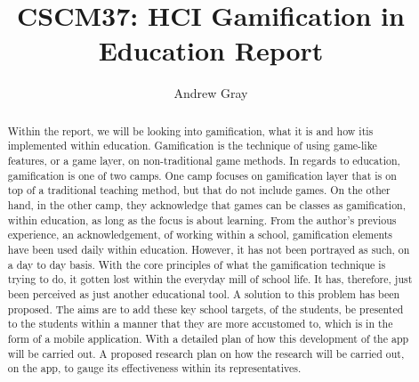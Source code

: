 \documentclass[sigchi]{acmart}
\begin{document}
\title{CSCM37: HCI Gamification in Education Report}

\author{Andrew Gray}


\renewcommand{\shortauthors}{Trovato and Tobin, et al.}

\begin{abstract}
  Within the report, we will be looking into gamification, what it is and how itis implemented within education. Gamification is the technique of using game-like features, or a game layer, on non-traditional game methods. In regards to education,  gamification is one of two camps. One camp focuses on gamification layer that is on top of a traditional teaching method, but that do not include games.  On the other hand, in the other camp, they acknowledge that games can be classes as gamification, within education, as long as the focus is about learning. From the author's previous experience, an acknowledgement, of working within a school, gamification elements have been used daily within education. However, it has not been portrayed as such, on a day to day basis. With the core principles of what the gamification technique is trying to do, it gotten lost within the everyday mill of school life. It has, therefore, just been perceived as just another educational tool. A solution to this problem has been proposed. The aims are to add these key school targets, of the students, be presented to the students within a manner that they are more accustomed to, which is in the form of a mobile application. With a detailed plan of how this development of the app will be carried out. A proposed research plan on how the research will be carried out, on the app, to gauge its effectiveness within its representatives. 
\end{abstract}
\end{document}
